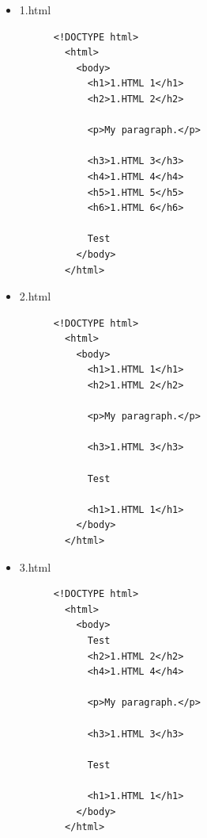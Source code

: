 \documentclass[]{article}
\begin{document}
\begin{itemize}
  \item 1.html
    \begin{lstlisting}
      <!DOCTYPE html>
        <html>
          <body>
            <h1>1.HTML 1</h1>
            <h2>1.HTML 2</h2>
            
            <p>My paragraph.</p>

            <h3>1.HTML 3</h3>
            <h4>1.HTML 4</h4>
            <h5>1.HTML 5</h5>
            <h6>1.HTML 6</h6>

            Test
          </body>
        </html>
    \end{lstlisting}
  \item 2.html
    \begin{lstlisting}
      <!DOCTYPE html>
        <html>
          <body>
            <h1>1.HTML 1</h1>
            <h2>1.HTML 2</h2>
            
            <p>My paragraph.</p>

            <h3>1.HTML 3</h3>

            Test

            <h1>1.HTML 1</h1>
          </body>
        </html>
    \end{lstlisting}
  \item 3.html
     \begin{lstlisting}
      <!DOCTYPE html>
        <html>
          <body>
            Test
            <h2>1.HTML 2</h2>
            <h4>1.HTML 4</h4>
            
            <p>My paragraph.</p>

            <h3>1.HTML 3</h3>

            Test

            <h1>1.HTML 1</h1>
          </body>
        </html>
    \end{lstlisting}
\end{itemize}
\end{document}
